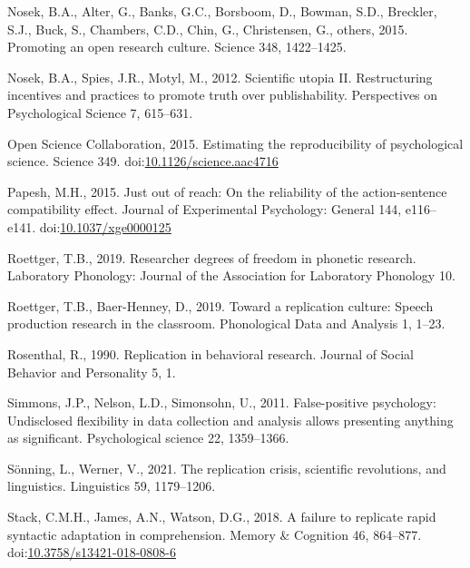 \documentclass[]{elsarticle} %
\newlength{\cslhangindent}
\newlength{\cslentryspacingunit} %
\newenvironment{CSLReferences}[2] %
 {%
  \setlength{\parindent}{0pt}
  \ifodd #1
  \let\oldpar\par
  \def\par{\hangindent=\cslhangindent\oldpar}
  \fi
  \setlength{\parskip}{#2\cslentryspacingunit}
 }%
 {}
\begin{document}
\begin{CSLReferences}{1}{0}
\leavevmode\hypertarget{ref-nosek2015promoting}{}%
Nosek, B.A., Alter, G., Banks, G.C., Borsboom, D., Bowman, S.D., Breckler, S.J., Buck, S., Chambers, C.D., Chin, G., Christensen, G., others, 2015. Promoting an open research culture. Science 348, 1422--1425.

\leavevmode\hypertarget{ref-nosek_scientific_2012}{}%
Nosek, B.A., Spies, J.R., Motyl, M., 2012. Scientific utopia {II}. {Restructuring} incentives and practices to promote truth over publishability. Perspectives on Psychological Science 7, 615--631.

\leavevmode\hypertarget{ref-open_science_collaboration_estimating_2015}{}%
Open Science Collaboration, 2015. Estimating the reproducibility of psychological science. Science 349. doi:\href{https://doi.org/10.1126/science.aac4716}{10.1126/science.aac4716}

\leavevmode\hypertarget{ref-papesh_just_2015}{}%
Papesh, M.H., 2015. Just out of reach: {On} the reliability of the action-sentence compatibility effect. Journal of Experimental Psychology: General 144, e116--e141. doi:\href{https://doi.org/10.1037/xge0000125}{10.1037/xge0000125}

\leavevmode\hypertarget{ref-roettger2019researcher}{}%
Roettger, T.B., 2019. Researcher degrees of freedom in phonetic research. Laboratory Phonology: Journal of the Association for Laboratory Phonology 10.

\leavevmode\hypertarget{ref-roettger_toward_2019}{}%
Roettger, T.B., Baer-Henney, D., 2019. Toward a replication culture: {Speech} production research in the classroom. Phonological Data and Analysis 1, 1--23.

\leavevmode\hypertarget{ref-rosenthal_replication_1990}{}%
Rosenthal, R., 1990. Replication in behavioral research. Journal of Social Behavior and Personality 5, 1.

\leavevmode\hypertarget{ref-simmons2011false}{}%
Simmons, J.P., Nelson, L.D., Simonsohn, U., 2011. False-positive psychology: Undisclosed flexibility in data collection and analysis allows presenting anything as significant. Psychological science 22, 1359--1366.

\leavevmode\hypertarget{ref-sonning2021replication}{}%
Sönning, L., Werner, V., 2021. The replication crisis, scientific revolutions, and linguistics. Linguistics 59, 1179--1206.

\leavevmode\hypertarget{ref-stack_failure_2018}{}%
Stack, C.M.H., James, A.N., Watson, D.G., 2018. A failure to replicate rapid syntactic adaptation in comprehension. Memory \& Cognition 46, 864--877. doi:\href{https://doi.org/10.3758/s13421-018-0808-6}{10.3758/s13421-018-0808-6}


\end{CSLReferences}
\end{document}
